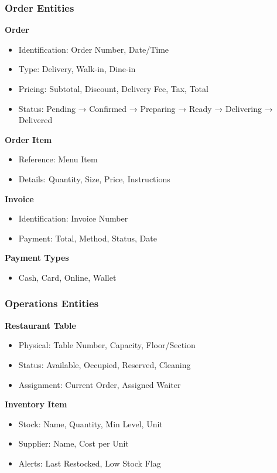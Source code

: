 \documentclass[12pt,a4paper]{article}
\begin{document}
\subsubsection{Order Entities}

\textbf{Order}
\begin{itemize}
    \item Identification: Order Number, Date/Time
    \item Type: Delivery, Walk-in, Dine-in
    \item Pricing: Subtotal, Discount, Delivery Fee, Tax, Total
    \item Status: Pending → Confirmed → Preparing → Ready → Delivering → Delivered
\end{itemize}

\textbf{Order Item}
\begin{itemize}
    \item Reference: Menu Item
    \item Details: Quantity, Size, Price, Instructions
\end{itemize}

\textbf{Invoice}
\begin{itemize}
    \item Identification: Invoice Number
    \item Payment: Total, Method, Status, Date
\end{itemize}

\textbf{Payment Types}
\begin{itemize}
    \item Cash, Card, Online, Wallet
\end{itemize}

\subsubsection{Operations Entities}

\textbf{Restaurant Table}
\begin{itemize}
    \item Physical: Table Number, Capacity, Floor/Section
    \item Status: Available, Occupied, Reserved, Cleaning
    \item Assignment: Current Order, Assigned Waiter
\end{itemize}

\textbf{Inventory Item}
\begin{itemize}
    \item Stock: Name, Quantity, Min Level, Unit
    \item Supplier: Name, Cost per Unit
    \item Alerts: Last Restocked, Low Stock Flag
\end{itemize}
\end{document}
